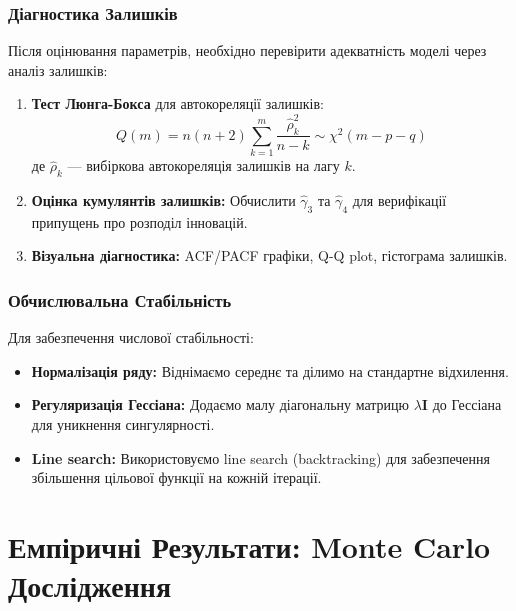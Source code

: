 \documentclass[12pt,a4paper]{article}
\begin{document}
\subsubsection{Діагностика Залишків}

Після оцінювання параметрів, необхідно перевірити адекватність моделі через аналіз залишків:

\begin{enumerate}
    \item \textbf{Тест Люнга-Бокса} для автокореляції залишків:
    \begin{equation}
    \label{eq:ljung_box}
    Q(m) = n(n+2) \sum_{k=1}^{m} \frac{\hat{\rho}_k^2}{n-k} \sim \chi^2(m - p - q)
    \end{equation}
    де $\hat{\rho}_k$ --- вибіркова автокореляція залишків на лагу $k$.

    \item \textbf{Оцінка кумулянтів залишків:} Обчислити $\hat{\gamma}_3$ та $\hat{\gamma}_4$ для верифікації припущень про розподіл інновацій.

    \item \textbf{Візуальна діагностика:} ACF/PACF графіки, Q-Q plot, гістограма залишків.
\end{enumerate}

\subsubsection{Обчислювальна Стабільність}

Для забезпечення числової стабільності:

\begin{itemize}
    \item \textbf{Нормалізація ряду:} Віднімаємо середнє та ділимо на стандартне відхилення.

    \item \textbf{Регуляризація Гессіана:} Додаємо малу діагональну матрицю $\lambda \mathbf{I}$ до Гессіана для уникнення сингулярності.

    \item \textbf{Line search:} Використовуємо line search (backtracking) для забезпечення збільшення цільової функції на кожній ітерації.
\end{itemize}

\section{Емпіричні Результати: Monte Carlo Дослідження}
\label{sec:empirical}
\end{document}
